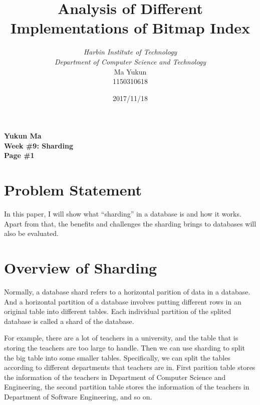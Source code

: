 \documentclass[12pt, a4paper]{article}
\begin{document}
\title{{\bf\Huge Analysis of Different Implementations of Bitmap Index}}
\author{\emph{Harbin Institute of Technology}\\\emph{Department of Computer Science and Technology}\\Ma Yukun\\1150310618}

\date{2017/11/18}

\nocite{*}


\begin{center}
{\textbf{
Yukun Ma\\
Week \#9: Sharding\\
Page \#1}}
\end{center}

\section{Problem Statement}

In this paper, I will show what ``sharding'' in a database is and how it works. Apart from that, the benefits and challenges the sharding brings to databases will also be evaluated.




\section{Overview of Sharding}

Normally, a database shard refers to a horizontal parition of data in a database.\cite{wiki} And a horizontal partition of a database involves putting different rows in an original table into different tables. Each individual partition of the splited database is called a shard of the database.

For example, there are a lot of teachers in a university, and the table that is storing the teachers are too large to handle. Then we can use sharding to split the big table into some smaller tables. Specifically, we can split the tables according to different departments that teachers are in. First parition table stores the information of the teachers in Department of Computer Science and Engineering, the second partition table stores the information of the teachers in Department of Software Engineering, and so on.
\end{document}
